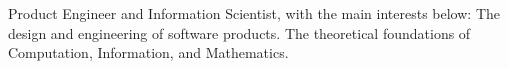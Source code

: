     \begin{cvparagraph}

        Product Engineer and Information Scientist, with the main interests below:\newline
        { The design and engineering of software products.}\newline
        { The theoretical foundations of Computation, Information, and Mathematics.}
    \end{cvparagraph}